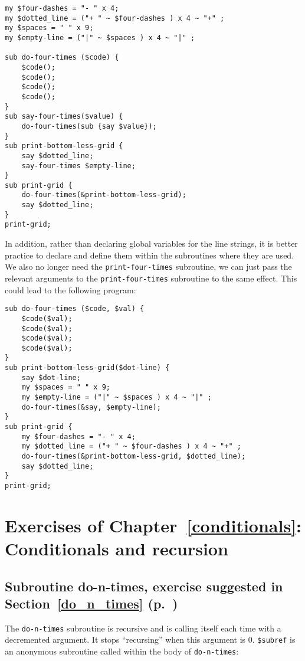 \begin{verbatim}
my $four-dashes = "- " x 4;
my $dotted_line = ("+ " ~ $four-dashes ) x 4 ~ "+" ;
my $spaces = " " x 9;
my $empty-line = ("|" ~ $spaces ) x 4 ~ "|" ;

sub do-four-times ($code) {
    $code();
    $code();
    $code();
    $code();
}
sub say-four-times($value) {
    do-four-times(sub {say $value});
}
sub print-bottom-less-grid {
    say $dotted_line;
    say-four-times $empty-line;
}
sub print-grid {
    do-four-times(&print-bottom-less-grid);
    say $dotted_line;
}
print-grid;
\end{verbatim}

In addition, rather than declaring global variables for the 
line strings, it is better practice to declare and define them 
within the subroutines where they are used. We also no longer 
need the {\tt print-four-times} subroutine, we can just 
pass the relevant arguments to the {\tt print-four-times} 
subroutine to the same effect. This could lead to the 
following program:

\begin{verbatim}
sub do-four-times ($code, $val) {
    $code($val);
    $code($val);
    $code($val);
    $code($val);
}
sub print-bottom-less-grid($dot-line) {
    say $dot-line;
    my $spaces = " " x 9;
    my $empty-line = ("|" ~ $spaces ) x 4 ~ "|" ;
    do-four-times(&say, $empty-line);
}
sub print-grid {
    my $four-dashes = "- " x 4;
    my $dotted_line = ("+ " ~ $four-dashes ) x 4 ~ "+" ;
    do-four-times(&print-bottom-less-grid, $dotted_line);
    say $dotted_line;
}
print-grid;
\end{verbatim}


\section{Exercises of Chapter~\ref{conditionals}: Conditionals and recursion}

\label{sol_do_n_times}

\subsection{Subroutine do-n-times, exercise suggested in Section~\ref{do_n_times} (p.~\pageref{do_n_times})}

The {\tt do-n-times} subroutine is recursive and is 
calling itself each time with a decremented argument. It 
stops ``recursing'' when this argument is 0. \verb'$subref' is an anonymous subroutine called within the body of 
{\tt do-n-times}:

